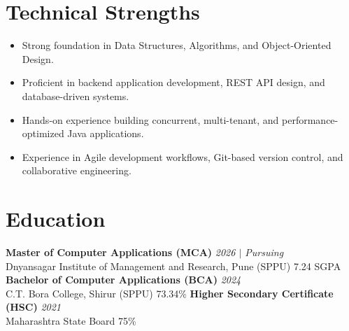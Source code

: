 \documentclass[10.5pt,a4paper]{article}
\begin{document}
\section{Technical Strengths}
\begin{itemize}
  \item Strong foundation in Data Structures, Algorithms, and Object-Oriented Design.
  \item Proficient in backend application development, REST API design, and database-driven systems.
  \item Hands-on experience building concurrent, multi-tenant, and performance-optimized Java applications.
  \item Experience in Agile development workflows, Git-based version control, and collaborative engineering.
\end{itemize}
\section{Education}
\textbf{Master of Computer Applications (MCA)} \hfill \textit{2026 $|$ Pursuing}\\
Dnyansagar Institute of Management and Research, Pune (SPPU) \hfill 7.24 SGPA
\vspace{2pt}
\textbf{Bachelor of Computer Applications (BCA)} \hfill \textit{2024}\\
C.T. Bora College, Shirur (SPPU) \hfill 73.34\%
\vspace{2pt}
\textbf{Higher Secondary Certificate (HSC)} \hfill \textit{2021}\\
Maharashtra State Board \hfill 75\%
\vspace{2pt}
\end{document}
